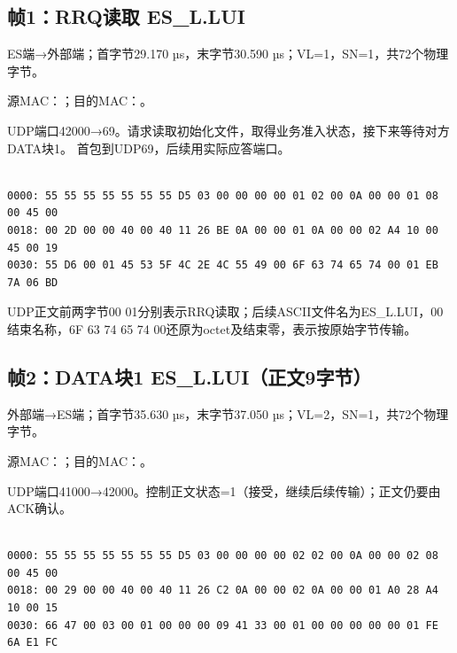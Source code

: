 \subsection*{帧1：RRQ读取 ES\_L.LUI}

ES端→外部端；首字节29.170 µs，末字节30.590 µs；VL=1，SN=1，共72个物理字节。

源MAC：；目的MAC：。

UDP端口42000→69。请求读取初始化文件，取得业务准入状态，接下来等待对方DATA块1。 首包到UDP69，后续用实际应答端口。

\par\noindent\begin{minipage}{\linewidth}
\begin{lstlisting}[caption={帧1物理字节，偏移0000--0047}]

0000: 55 55 55 55 55 55 55 D5 03 00 00 00 00 01 02 00 0A 00 00 01 08 00 45 00
0018: 00 2D 00 00 40 00 40 11 26 BE 0A 00 00 01 0A 00 00 02 A4 10 00 45 00 19
0030: 55 D6 00 01 45 53 5F 4C 2E 4C 55 49 00 6F 63 74 65 74 00 01 EB 7A 06 BD

\end{lstlisting}
\end{minipage}\par

UDP正文前两字节00 01分别表示RRQ读取；后续ASCII文件名为ES\_L.LUI，00结束名称，6F 63 74 65 74 00还原为octet及结束零，表示按原始字节传输。

\subsection*{帧2：DATA块1 ES\_L.LUI（正文9字节）}

外部端→ES端；首字节35.630 µs，末字节37.050 µs；VL=2，SN=1，共72个物理字节。

源MAC：；目的MAC：。

UDP端口41000→42000。控制正文状态=1（接受，继续后续传输）；正文仍要由ACK确认。

\par\noindent\begin{minipage}{\linewidth}
\begin{lstlisting}[caption={帧2物理字节，偏移0000--0047}]

0000: 55 55 55 55 55 55 55 D5 03 00 00 00 00 02 02 00 0A 00 00 02 08 00 45 00
0018: 00 29 00 00 40 00 40 11 26 C2 0A 00 00 02 0A 00 00 01 A0 28 A4 10 00 15
0030: 66 47 00 03 00 01 00 00 00 09 41 33 00 01 00 00 00 00 00 01 FE 6A E1 FC

\end{lstlisting}
\end{minipage}\par

